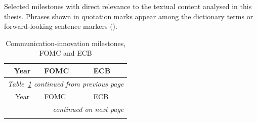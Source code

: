 \begin{threeparttable}
\begin{tablenotes}
  \item[] Selected milestones with direct relevance to the textual
    content analysed in this thesis. Phrases shown in quotation
    marks appear among the dictionary terms or forward-looking
    sentence markers
    ().
\end{tablenotes}

\begin{longtable}{cp{6.0cm}p{6.0cm}}
\caption{Communication-innovation milestones, FOMC and ECB}
\label{tab:comm_innovations}\\
\toprule
Year & FOMC & ECB \\
\midrule
\endfirsthead

\multicolumn{3}{l}{\footnotesize\itshape Table~\ref{tab:comm_innovations} continued from previous page}\\
\toprule
Year & FOMC & ECB \\
\midrule
\endhead

\midrule
\multicolumn{3}{r}{\footnotesize\itshape continued on next page}\\
\endfoot

\bottomrule

\endlastfoot


\end{longtable}
\end{threeparttable}
